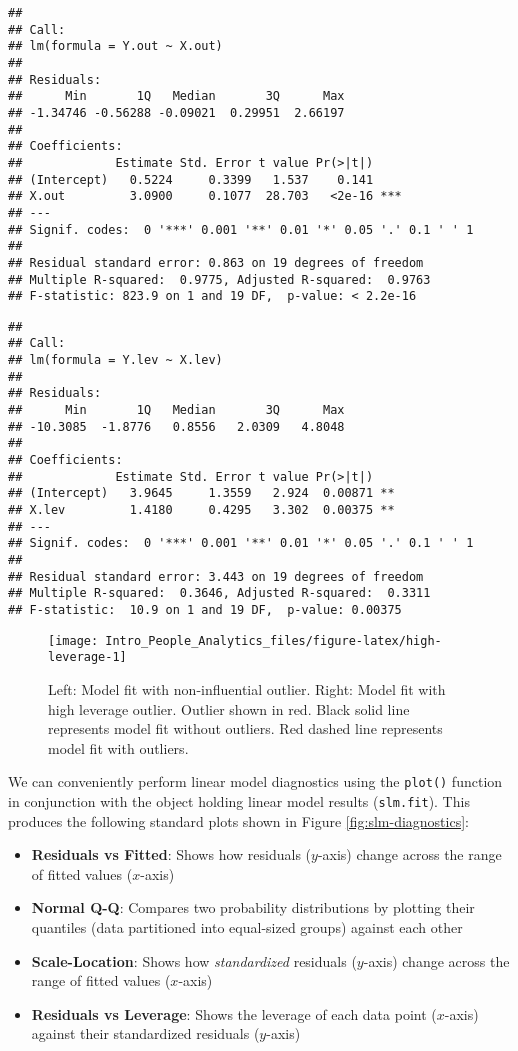 \documentclass[
]{book}
\providecommand{\tightlist}{%
  \setlength{\itemsep}{0pt}\setlength{\parskip}{0pt}}
\begin{document}
\begin{verbatim}
## 
## Call:
## lm(formula = Y.out ~ X.out)
## 
## Residuals:
##      Min       1Q   Median       3Q      Max 
## -1.34746 -0.56288 -0.09021  0.29951  2.66197 
## 
## Coefficients:
##             Estimate Std. Error t value Pr(>|t|)    
## (Intercept)   0.5224     0.3399   1.537    0.141    
## X.out         3.0900     0.1077  28.703   <2e-16 ***
## ---
## Signif. codes:  0 '***' 0.001 '**' 0.01 '*' 0.05 '.' 0.1 ' ' 1
## 
## Residual standard error: 0.863 on 19 degrees of freedom
## Multiple R-squared:  0.9775, Adjusted R-squared:  0.9763 
## F-statistic: 823.9 on 1 and 19 DF,  p-value: < 2.2e-16
\end{verbatim}

\begin{verbatim}
## 
## Call:
## lm(formula = Y.lev ~ X.lev)
## 
## Residuals:
##      Min       1Q   Median       3Q      Max 
## -10.3085  -1.8776   0.8556   2.0309   4.8048 
## 
## Coefficients:
##             Estimate Std. Error t value Pr(>|t|)   
## (Intercept)   3.9645     1.3559   2.924  0.00871 **
## X.lev         1.4180     0.4295   3.302  0.00375 **
## ---
## Signif. codes:  0 '***' 0.001 '**' 0.01 '*' 0.05 '.' 0.1 ' ' 1
## 
## Residual standard error: 3.443 on 19 degrees of freedom
## Multiple R-squared:  0.3646, Adjusted R-squared:  0.3311 
## F-statistic:  10.9 on 1 and 19 DF,  p-value: 0.00375
\end{verbatim}

\begin{figure}

{\centering \texttt{[image: Intro\_People\_Analytics\_files/figure-latex/high-leverage-1]} 

}

\caption{Left: Model fit with non-influential outlier. Right: Model fit with high leverage outlier. Outlier shown in red. Black solid line represents model fit without outliers. Red dashed line represents model fit with outliers.}\label{fig:high-leverage}
\end{figure}

We can conveniently perform linear model diagnostics using the \texttt{plot()} function in conjunction with the object holding linear model results (\texttt{slm.fit}). This produces the following standard plots shown in Figure \ref{fig:slm-diagnostics}:

\begin{itemize}
\tightlist
\item
  \textbf{Residuals vs Fitted}: Shows how residuals (\(y\)-axis) change across the range of fitted values (\(x\)-axis)
\item
  \textbf{Normal Q-Q}: Compares two probability distributions by plotting their quantiles (data partitioned into equal-sized groups) against each other
\item
  \textbf{Scale-Location}: Shows how \emph{standardized} residuals (\(y\)-axis) change across the range of fitted values (\(x\)-axis)
\item
  \textbf{Residuals vs Leverage}: Shows the leverage of each data point (\(x\)-axis) against their standardized residuals (\(y\)-axis)
\end{itemize}
\end{document}
